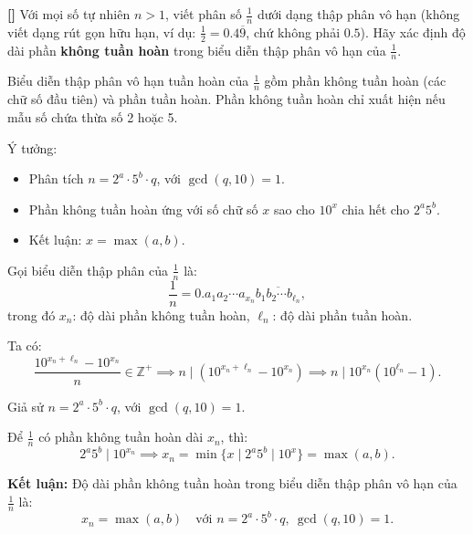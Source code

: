 \documentclass[../01-divisibility.tex]{subfiles}
\begin{document}
\begin{example*}\label{example:IND-2015-N2}\textbf{[]}
	Với mọi số tự nhiên \( n > 1 \), viết phân số \( \frac{1}{n} \) dưới dạng thập phân vô hạn (không viết dạng rút gọn hữu hạn,
	ví dụ: \( \frac{1}{2} = 0.4\overline{9} \), chứ không phải \( 0.5 \)).
	Hãy xác định độ dài phần \textbf{không tuần hoàn} trong biểu diễn thập phân vô hạn của \( \frac{1}{n} \).
\end{example*}

\begin{story*}
	Biểu diễn thập phân vô hạn tuần hoàn của \( \frac{1}{n} \) gồm phần không tuần hoàn (các chữ số đầu tiên) và phần tuần hoàn.
	Phần không tuần hoàn chỉ xuất hiện nếu mẫu số chứa thừa số 2 hoặc 5.

	Ý tưởng:
	\begin{itemize}[topsep=0pt, itemsep=0pt]
	    \item Phân tích \( n = 2^a \cdot 5^b \cdot q \), với \( \gcd(q, 10) = 1 \).
	    \item Phần không tuần hoàn ứng với số chữ số \( x \) sao cho \( 10^x \) chia hết cho \( 2^a 5^b \).
	    \item Kết luận: \( x = \max(a, b) \).
	\end{itemize}
\end{story*}

\begin{soln}\footnotemark
	Gọi biểu diễn thập phân của \( \frac{1}{n} \) là:
	\[
		\frac{1}{n} = 0.a_1a_2 \cdots a_{x_n} \overline{b_1b_2 \cdots b_{\ell_n}},
	\]
	trong đó \( x_n \): độ dài phần không tuần hoàn, \( \ell_n \): độ dài phần tuần hoàn.

	Ta có:
	\[
		\frac{10^{x_n + \ell_n} - 10^{x_n}}{n} \in \mathbb{Z}^+
		\implies n \mid \left(10^{x_n + \ell_n} - 10^{x_n}\right)
		\implies n \mid 10^{x_n}(10^{\ell_n} - 1).
	\]

	Giả sử \( n = 2^a \cdot 5^b \cdot q \), với \( \gcd(q,10)=1 \).

	Để \( \frac{1}{n} \) có phần không tuần hoàn dài \( x_n \), thì:
	\[
		2^a 5^b \mid 10^{x_n}
		\implies x_n = \min\{x \mid 2^a 5^b \mid 10^x\} = \max(a, b).
	\]

	\textbf{Kết luận:} Độ dài phần không tuần hoàn trong biểu diễn thập phân vô hạn của \( \frac{1}{n} \) là:
	\[
		x_n = \max(a, b) \quad \text{với } n = 2^a \cdot 5^b \cdot q,\ \gcd(q, 10) = 1.
	\]
\end{soln}

\end{document}
